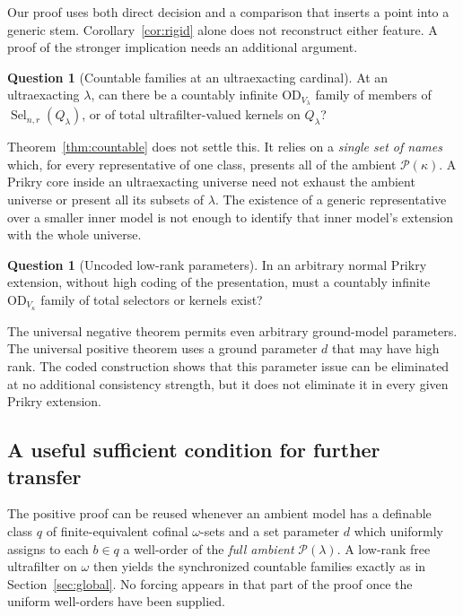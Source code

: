 \documentclass[11pt,letterpaper]{article}
\theoremstyle{definition}
\newtheorem{question}[definition]{Question}
\numberwithin{equation}{section}
\newcommand{\OD}{\mathrm{OD}}
\newcommand{\Pow}{\mathcal P}
\newcommand{\Sel}{\operatorname{Sel}}
\begin{document}
Our proof uses both direct decision and a comparison that inserts a point into a generic stem. Corollary~\ref{cor:rigid} alone does not reconstruct either feature. A proof of the stronger implication needs an additional argument.

\begin{question}[Countable families at an ultraexacting cardinal]
At an ultraexacting $\lambda$, can there be a countably infinite $\OD_{V_\lambda}$ family of members of $\Sel_{n,r}(Q_\lambda)$, or of total ultrafilter-valued kernels on $Q_\lambda$?
\end{question}

Theorem~\ref{thm:countable} does not settle this. It relies on a \emph{single set of names} which, for every representative of one class, presents all of the ambient $\Pow(\kappa)$. A Prikry core inside an ultraexacting universe need not exhaust the ambient universe or present all its subsets of $\lambda$. The existence of a generic representative over a smaller inner model is not enough to identify that inner model's extension with the whole universe.

\begin{question}[Uncoded low-rank parameters]
In an arbitrary normal Prikry extension, without high coding of the presentation, must a countably infinite $\OD_{V_\kappa}$ family of total selectors or kernels exist?
\end{question}

The universal negative theorem permits even arbitrary ground-model parameters. The universal positive theorem uses a ground parameter $d$ that may have high rank. The coded construction shows that this parameter issue can be eliminated at no additional consistency strength, but it does not eliminate it in every given Prikry extension.

\subsection{A useful sufficient condition for further transfer}

The positive proof can be reused whenever an ambient model has a definable class $q$ of finite-equivalent cofinal $\omega$-sets and a set parameter $d$ which uniformly assigns to each $b\in q$ a well-order of the \emph{full ambient} $\Pow(\lambda)$. A low-rank free ultrafilter on $\omega$ then yields the synchronized countable families exactly as in Section~\ref{sec:global}. No forcing appears in that part of the proof once the uniform well-orders have been supplied.
\end{document}
